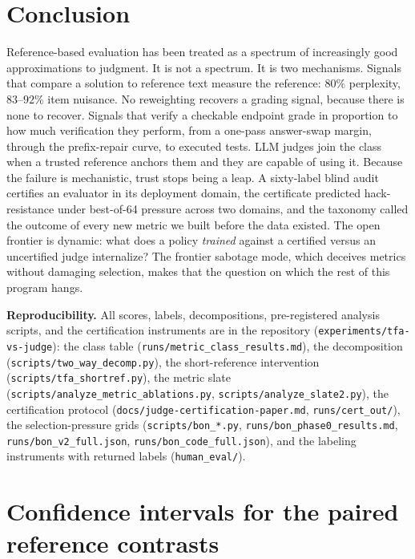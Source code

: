 \documentclass[11pt]{article}
\begin{document}
\section{Conclusion}
\label{sec:conclusion}

Reference-based evaluation has been treated as a spectrum of increasingly good approximations to judgment.
It is not a spectrum.
It is two mechanisms.
Signals that compare a solution to reference text measure the reference: $80\%$ perplexity, $83$--$92\%$ item nuisance.
No reweighting recovers a grading signal, because there is none to recover.
Signals that verify a checkable endpoint grade in proportion to how much verification they perform, from a one-pass answer-swap margin, through the prefix-repair curve, to executed tests.
LLM judges join the class when a trusted reference anchors them and they are capable of using it.
Because the failure is mechanistic, trust stops being a leap.
A sixty-label blind audit certifies an evaluator in its deployment domain, the certificate predicted hack-resistance under best-of-64 pressure across two domains, and the taxonomy called the outcome of every new metric we built before the data existed.
The open frontier is dynamic: what does a policy \emph{trained} against a certified versus an uncertified judge internalize?
The frontier sabotage mode, which deceives metrics without damaging selection, makes that the question on which the rest of this program hangs.

\vspace{1em}
\noindent\textbf{Reproducibility.}
All scores, labels, decompositions, pre-registered analysis scripts, and the certification instruments are in the repository (\texttt{experiments/tfa-vs-judge}): the class table (\texttt{runs/metric\_class\_results.md}), the decomposition (\texttt{scripts/two\_way\_decomp.py}), the short-reference intervention (\texttt{scripts/tfa\_shortref.py}), the metric slate (\texttt{scripts/analyze\_metric\_ablations.py}, \texttt{scripts/analyze\_slate2.py}), the certification protocol (\texttt{docs/judge-certification-paper.md}, \texttt{runs/cert\_out/}), the selection-pressure grids (\texttt{scripts/bon\_*.py}, \texttt{runs/bon\_phase0\_results.md}, \texttt{runs/bon\_v2\_full.json}, \texttt{runs/bon\_code\_full.json}), and the labeling instruments with returned labels (\texttt{human\_eval/}).

\appendix

\section{Confidence intervals for the paired reference contrasts}
\label{app:cis}
\end{document}
